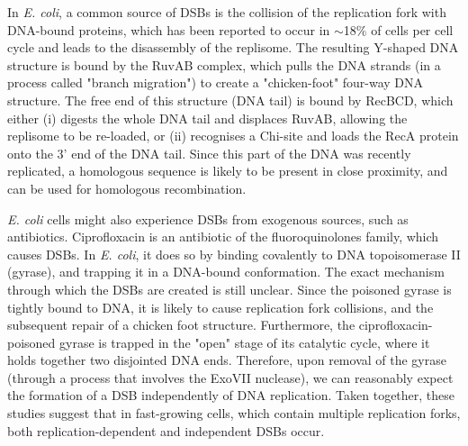 In \emph{E. coli}, a common source of DSBs is the collision of the replication fork with DNA-bound proteins, which has been reported to occur in $\sim$18\% of cells per cell cycle\cite{Sinha2018} and leads to the disassembly of the replisome\cite{Michel1997}. The resulting Y-shaped DNA structure is bound by the RuvAB complex, which pulls the DNA strands (in a process called "branch migration") to create a "chicken-foot" four-way DNA structure\cite{Seigneur1998}. The free end of this structure (DNA tail) is bound by RecBCD, which either (i) digests the whole DNA tail and displaces RuvAB, allowing the replisome to be re-loaded, or (ii) recognises a Chi-site and loads the RecA protein onto the 3' end of the DNA tail\cite{Michel2001}. Since this part of the DNA was recently replicated, a homologous sequence is likely to be present in close proximity, and can be used for homologous recombination.

\emph{E. coli} cells might also experience DSBs from exo\-genous sources, such as anti\-biotics. Ciprofloxacin is an antibiotic of the fluoro\-quinolones family, which causes DSBs. In \emph{E. coli}, it does so by binding covalently to DNA topoisomerase II (gyrase), and trapping it in a DNA-bound conformation\cite{Kohanski2010}. The exact mechanism through which the DSBs are created is still unclear. Since the poisoned gyrase is tightly bound to DNA, it is likely to cause replication fork collisions\cite{Wentzell2000, Drlica2008}, and the subsequent repair of a chicken foot structure. Furthermore, the ciprofloxacin-poisoned gyrase is trapped in the "open" stage of its catalytic cycle, where it holds together two disjointed DNA ends. Therefore, upon removal of the gyrase (through a process that involves the ExoVII nuclease\cite{Huang2021}), we can reasonably expect the formation of a DSB independently of DNA replication\cite{Zhao2006}. Taken together, these studies suggest that in fast-growing cells, which contain multiple replication forks, both replication-dependent and independent DSBs occur.

